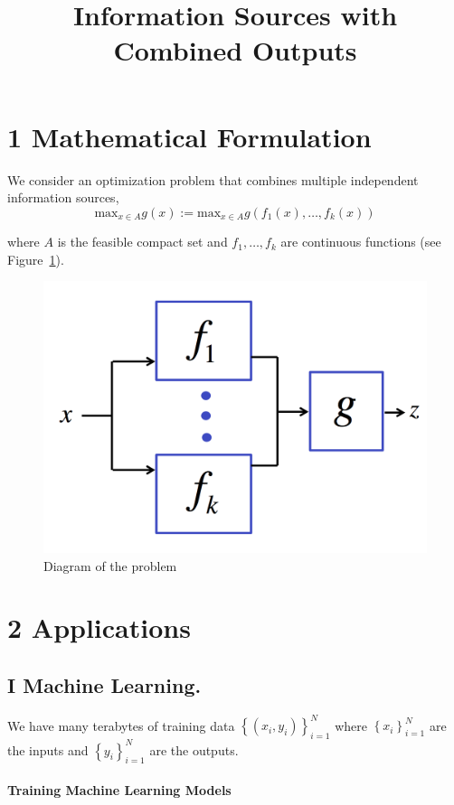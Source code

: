\documentclass[12pt,english]{article}
\date{}
\begin{document}
\title{Information Sources with Combined Outputs}

\maketitle

\section*{1 Mathematical Formulation}

We consider an optimization problem that combines multiple independent
information sources,
\[
\mbox{max}_{x\in A}g\left(x\right):=\mbox{max}_{x\in A}g\left(f_{1}\left(x\right),\ldots,f_{k}\left(x\right)\right)
\]

where $A$ is the feasible compact set and $f_{1},\ldots,f_{k}$ are continuous
functions (see Figure~\ref{fig:fig1}). 

\begin{figure}[htp]
\centering
\includegraphics[width=.5\textwidth]{01.png}
\caption{Diagram of the problem}
\label{fig:fig1}
\end{figure}

\section*{2 Applications}



\subsection*{I Machine Learning.}

We have many terabytes of training data $\left\{ \left(x_{i},y_{i}\right)\right\} _{i=1}^{N}$
where $\left\{ x_{i}\right\} _{i=1}^{N}$ are the inputs and $\left\{ y_{i}\right\} _{i=1}^{N}$
are the outputs. 


\paragraph*{Training Machine Learning Models}
\end{document}
